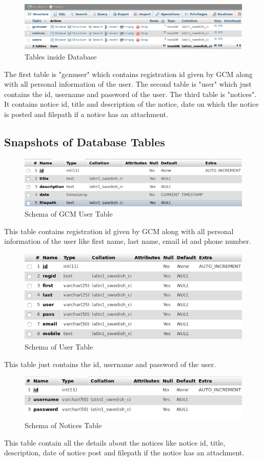 \begin{figure}[H]
\centering \includegraphics[scale=0.5]{image/db.png}
\caption{Tables inside Database}
\end{figure}

The first table is "gcmuser" which contains registration id given by GCM along with all personal information of the user.
The second table is "user" which just contains the id, username and password of the user.
The third table is "notices". It contains notice id, title and description of the notice, date on which the notice is posted
and filepath if a notice has an attachment.

\subsection{Snapshots of Database Tables}

\begin{figure}[H]
\centering \includegraphics[scale=0.5]{image/db1.png}
\caption{Schema of GCM User Table}
\end{figure}
This table contains registration id given by GCM along with all personal information of the user like first name, last name, email id and
phone number.

\begin{figure}[H]
\centering \includegraphics[scale=0.5]{image/db2.png}
\caption{Schema of User Table}
\end{figure}
This table just contains the id, username and password of the user.


\begin{figure}[H]
\centering \includegraphics[scale=0.5]{image/db3.png}
\caption{Schema of Notices Table}
\end{figure}
This table contain all the details about the notices like notice id, title, description, date of notice post and filepath if the notice has an attachment.
